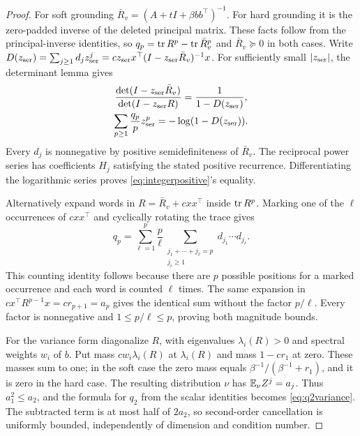\begin{proof}
For soft grounding $\bar R_v=(A+tI+\beta bb^\top)^{-1}$.
For hard grounding it is the zero-padded inverse of the deleted
principal matrix. These facts follow from the principal-inverse identities,
so $q_p=\operatorname{tr} R^p-\operatorname{tr} \bar R_v^p$ and $\bar R_v\succeq0$ in both cases.
Write $D(z_{\rm ser})=\sum_{j\geq1}d_jz_{\rm ser}^j=c z_{\rm ser}x^\top(I-z_{\rm ser}\bar R_v)^{-1}x$.
For sufficiently small $|z_{\rm ser}|$, the determinant lemma gives
\begin{gather*}
 \frac{\det(I-z_{\rm ser}\bar R_v)}{\det(I-z_{\rm ser}R)}=\frac1{1-D(z_{\rm ser})},\\
 \sum_{p\geq1}\frac{q_p}{p}z_{\rm ser}^p=-\log(1-D(z_{\rm ser})).
\end{gather*}
Every $d_j$ is nonnegative by positive semidefiniteness of $\bar R_v$.
The reciprocal power series has coefficients $H_j$ satisfying the
stated positive recurrence. Differentiating the logarithmic series
proves \eqref{eq:integerpositive}'s equality.

Alternatively expand words in $R=\bar R_v+cxx^\top$ inside $\operatorname{tr} R^p$.
Marking one of the $\ell$ occurrences of $cxx^\top$ and cyclically
rotating the trace gives
\[
 q_p=\sum_{\ell=1}^p\frac p\ell
       \sum_{\substack{j_1+\cdots+j_\ell=p\\j_i\geq1}}
       d_{j_1}\cdots d_{j_\ell}.
\]
This counting identity follows because there are $p$ possible
positions for a marked occurrence and each word is counted $\ell$
times. The same expansion in $cx^\top R^{p-1}x=cr_{p+1}=a_p$
gives the identical sum without the factor $p/\ell$.
Every factor is nonnegative and $1\leq p/\ell\leq p$, proving
both magnitude bounds.

For the variance form diagonalize $R$, with eigenvalues $\lambda_i(R)>0$
and spectral weights $w_i$ of $b$. Put mass $cw_i \lambda_i(R)$ at $\lambda_i(R)$
and mass $1-cr_1$ at zero. These masses sum to one; in the soft
case the zero mass equals $\beta^{-1}/(\beta^{-1}+r_1)$, and it
is zero in the hard case. The resulting distribution $\nu$ has
$\mathbb E_\nu Z^j=a_j$. Thus $a_1^2\leq a_2$, and the formula for
$q_2$ from the scalar identities becomes \eqref{eq:q2variance}. The subtracted term
is at most half of $2a_2$, so second-order cancellation is uniformly
bounded, independently of dimension and condition number.
\end{proof}

